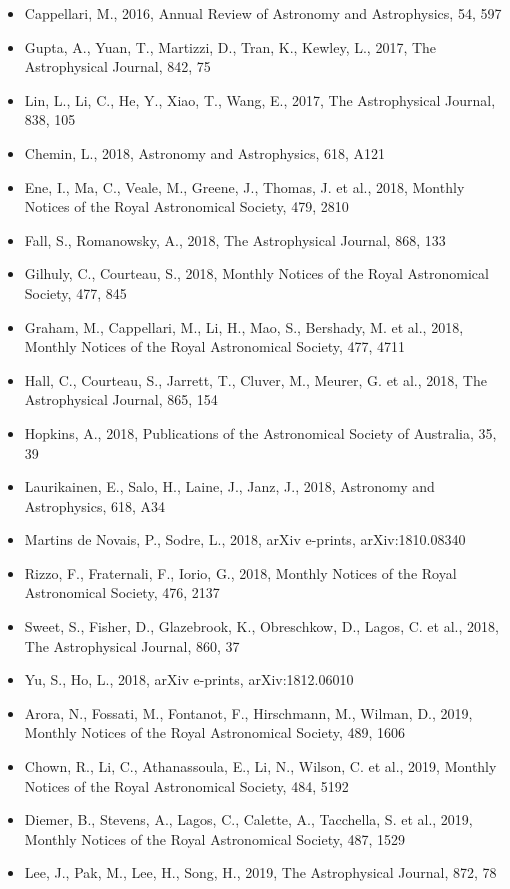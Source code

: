 \documentclass{letter}
\begin{document}
\begin{enumerate}
\begin{itemize}
\item Cappellari, M., 2016, Annual Review of Astronomy and Astrophysics, 54, 597
\item Gupta, A., Yuan, T., Martizzi, D., Tran, K., Kewley, L., 2017, The Astrophysical Journal, 842, 75
\item Lin, L., Li, C., He, Y., Xiao, T., Wang, E., 2017, The Astrophysical Journal, 838, 105
\item Chemin, L., 2018, Astronomy and Astrophysics, 618, A121
\item Ene, I., Ma, C., Veale, M., Greene, J., Thomas, J. et al., 2018, Monthly Notices of the Royal Astronomical Society, 479, 2810
\item Fall, S., Romanowsky, A., 2018, The Astrophysical Journal, 868, 133
\item Gilhuly, C., Courteau, S., 2018, Monthly Notices of the Royal Astronomical Society, 477, 845
\item Graham, M., Cappellari, M., Li, H., Mao, S., Bershady, M. et al., 2018, Monthly Notices of the Royal Astronomical Society, 477, 4711
\item Hall, C., Courteau, S., Jarrett, T., Cluver, M., Meurer, G. et al., 2018, The Astrophysical Journal, 865, 154
\item Hopkins, A., 2018, Publications of the Astronomical Society of Australia, 35, 39
\item Laurikainen, E., Salo, H., Laine, J., Janz, J., 2018, Astronomy and Astrophysics, 618, A34
\item Martins de Novais, P., Sodre, L., 2018, arXiv e-prints, arXiv:1810.08340
\item Rizzo, F., Fraternali, F., Iorio, G., 2018, Monthly Notices of the Royal Astronomical Society, 476, 2137
\item Sweet, S., Fisher, D., Glazebrook, K., Obreschkow, D., Lagos, C. et al., 2018, The Astrophysical Journal, 860, 37
\item Yu, S., Ho, L., 2018, arXiv e-prints, arXiv:1812.06010
\item Arora, N., Fossati, M., Fontanot, F., Hirschmann, M., Wilman, D., 2019, Monthly Notices of the Royal Astronomical Society, 489, 1606
\item Chown, R., Li, C., Athanassoula, E., Li, N., Wilson, C. et al., 2019, Monthly Notices of the Royal Astronomical Society, 484, 5192
\item Diemer, B., Stevens, A., Lagos, C., Calette, A., Tacchella, S. et al., 2019, Monthly Notices of the Royal Astronomical Society, 487, 1529
\item Lee, J., Pak, M., Lee, H., Song, H., 2019, The Astrophysical Journal, 872, 78

\end{itemize}
\end{enumerate}
\end{document}
